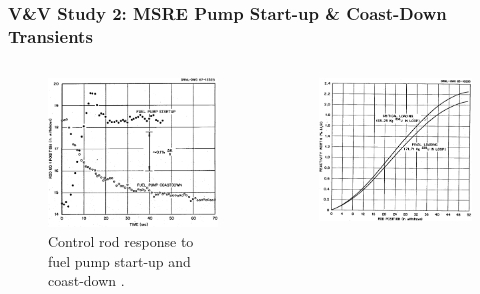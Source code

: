 \begin{frame}[noframenumbering]
  \frametitle{V\&V Study 2: MSRE Pump Start-up \& Coast-Down Transients}
  \begin{columns}
    \column[t]{4cm}
    \begin{figure}
      \centering
      \includegraphics[width=.9\columnwidth]{../images/msre-transient}
      \caption{Control rod response to fuel pump start-up and coast-down
      \cite{prince_zero-power_1968}.}
    \end{figure}
    \hfill
    \column[t]{4cm}
    \begin{figure}
      \centering
      \includegraphics[width=.9\columnwidth]{../images/msre-rod-worth}

\end{figure}
\end{columns}
\end{frame}
